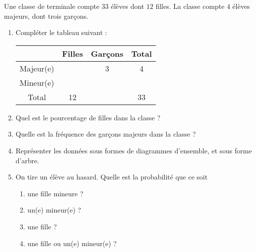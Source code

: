 
\begin{exercice}\label{exosmath-0219}

    Une classe de terminale compte \( 33\) élèves dont \( 12\) filles. La classe compte \( 4\) élèves majeurs, dont trois garçons.
    \begin{enumerate}
        \item
            Compléter le tableau suivant :
            \begin{center}
            \begin{tabular}[]{|c||c|c|c|}
                \hline
                &Filles&Garçons&Total\\
                \hline\hline
                Majeur(e)&&3&4\\\hline
                Mineur(e)&&&\\
                \hline
                Total&12&&33\\
                \hline
            \end{tabular}
            \end{center}
        \item
            Quel est le pourcentage de filles dans la classe ?
        \item
            Quelle est la fréquence des garçons majeurs dans la classe ?
        \item
            Représenter les données sous formes de diagrammes d'ensemble, et sous forme d'arbre.
        \item
            On tire un élève au hasard. Quelle est la probabilité que ce soit
            \begin{enumerate}
                \item
                    une fille mineure ?
                \item
                    un(e) mineur(e) ?
                \item
                    une fille ?
                \item
                    une fille ou un(e) mineur(e) ?
            \end{enumerate}
            
    \end{enumerate}

\end{exercice}
